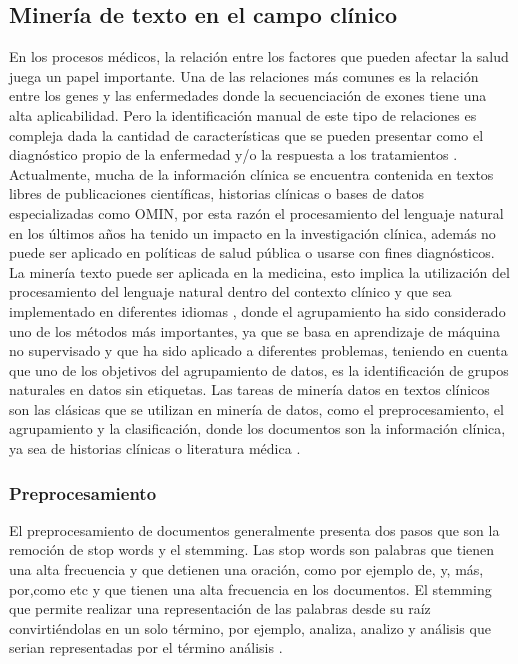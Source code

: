 \subsection{Minería de texto en el campo clínico}

En los procesos médicos, la relación entre los factores que pueden afectar la salud juega un papel importante. Una de las relaciones más comunes es la relación entre los genes y las enfermedades donde la secuenciación de exones tiene una alta aplicabilidad. Pero la identificación manual de este tipo de relaciones es compleja dada la cantidad de características que se pueden presentar como el diagnóstico propio de la enfermedad y/o la respuesta a los tratamientos \cite{Kawashima2017}.\\

Actualmente, mucha de la información clínica se encuentra contenida en textos libres de publicaciones científicas, historias clínicas o bases de datos especializadas como OMIN, por esta razón el procesamiento del lenguaje natural en los últimos años ha tenido un impacto en la investigación clínica, además no puede ser aplicado en políticas de salud pública o usarse con fines diagnósticos. \cite{Neveol2014}\\

La minería texto puede ser aplicada en la medicina, esto implica la utilización del procesamiento del lenguaje natural dentro del contexto clínico y que sea implementado en diferentes idiomas \cite{Neveol2014}, donde el agrupamiento ha sido considerado uno de los métodos más importantes, ya que se basa en aprendizaje de máquina no supervisado y que ha sido aplicado a diferentes problemas\cite{Kawashima2017}, teniendo en cuenta que uno de los objetivos del agrupamiento de datos, es la  identificación de grupos naturales en datos sin etiquetas. Las tareas de minería datos en textos clínicos son las clásicas que se utilizan en minería de datos, como el preprocesamiento, el agrupamiento y la clasificación, donde los documentos son la información clínica, ya sea de historias clínicas o literatura médica \cite{Jain2010,Renganathan2017}.


\subsubsection{Preprocesamiento}

El preprocesamiento de documentos generalmente presenta dos pasos que son la remoción de stop words y el stemming. Las stop words son palabras que tienen una alta frecuencia y  que detienen una oración, como por ejemplo de, y, más, por,como etc y que tienen una alta frecuencia en los documentos. El stemming  que permite realizar una representación de las palabras desde su raíz convirtiéndolas en un solo término, por ejemplo, analiza, analizo y análisis que serian representadas por el término análisis \cite{Renganathan2017}.\\


